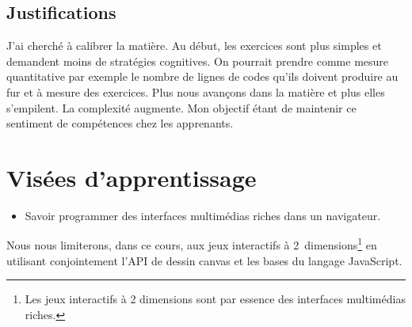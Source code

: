 \subsection{Justifications}

J'ai cherché à calibrer la matière. Au début, les exercices sont plus simples et demandent moins de stratégies cognitives. On pourrait prendre comme mesure quantitative par exemple le nombre de lignes de codes qu'ils doivent produire au fur et à mesure
des exercices. Plus nous avançons dans la matière et plus elles s’empilent. La complexité augmente. Mon objectif étant de maintenir ce sentiment de compétences\cite{viau1994motivation} chez les apprenants.

\clearpage
\section{Visées d’apprentissage}
\begin{itemize}
    \item Savoir programmer des interfaces multimédias riches dans un navigateur.
\end{itemize}

Nous nous limiterons, dans ce cours, aux jeux interactifs à 2~dimensions\footnote{Les jeux interactifs à 2 dimensions sont par essence des interfaces multimédias riches.} en utilisant conjointement l’API de dessin canvas et les bases du langage JavaScript.

